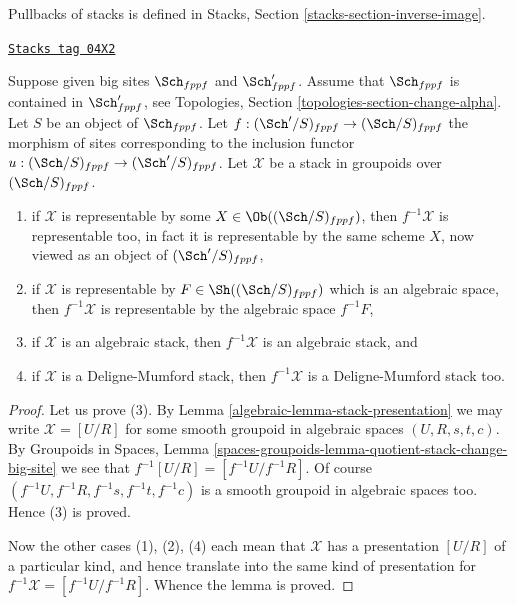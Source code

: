 \medskip\noindent
Pullbacks of stacks is defined in
Stacks, Section \ref{stacks-section-inverse-image}.

\begin{lemma}
\label{algebraic-lemma-change-big-site}
\href{https://stacks.math.columbia.edu/tag/04X2}{\texttt{Stacks tag 04X2}}

Suppose given big sites $\Sch_{fppf}$ and $\Sch'_{fppf}$.
Assume that $\Sch_{fppf}$ is contained in $\Sch'_{fppf}$,
see Topologies, Section \ref{topologies-section-change-alpha}.
Let $S$ be an object of $\Sch_{fppf}$.
Let $f : (\Sch'/S)_{fppf} \to (\Sch/S)_{fppf}$ the morphism
of sites corresponding to the inclusion functor
$u : (\Sch/S)_{fppf} \to (\Sch'/S)_{fppf}$.
Let $\mathcal{X}$ be a stack in groupoids over $(\Sch/S)_{fppf}$.
\begin{enumerate}
\item if $\mathcal{X}$ is representable by some
$X \in \Ob((\Sch/S)_{fppf})$, then
$f^{-1}\mathcal{X}$ is representable too, in fact it is representable by the
same scheme $X$, now viewed as an object of $(\Sch'/S)_{fppf}$,
\item if $\mathcal{X}$ is representable by
$F \in \Sh((\Sch/S)_{fppf})$ which is
an algebraic space, then $f^{-1}\mathcal{X}$ is representable
by the algebraic space $f^{-1}F$,
\item if $\mathcal{X}$ is an algebraic stack, then $f^{-1}\mathcal{X}$
is an algebraic stack, and
\item if $\mathcal{X}$ is a Deligne-Mumford stack, then $f^{-1}\mathcal{X}$
is a Deligne-Mumford stack too.
\end{enumerate}
\end{lemma}

\begin{proof}

Let us prove (3). By
Lemma \ref{algebraic-lemma-stack-presentation}
we may write $\mathcal{X} = [U/R]$ for some smooth
groupoid in algebraic spaces $(U, R, s, t, c)$. By
Groupoids in Spaces,
Lemma \ref{spaces-groupoids-lemma-quotient-stack-change-big-site}
we see that $f^{-1}[U/R] = [f^{-1}U/f^{-1}R]$.
Of course $(f^{-1}U, f^{-1}R, f^{-1}s, f^{-1}t, f^{-1}c)$
is a smooth groupoid in algebraic spaces too. Hence (3) is proved.

\medskip\noindent
Now the other cases (1), (2), (4) each mean that $\mathcal{X}$ has
a presentation $[U/R]$ of a particular kind, and hence translate into the
same kind of presentation for $f^{-1}\mathcal{X} = [f^{-1}U/f^{-1}R]$.
Whence the lemma is proved.
\end{proof}

